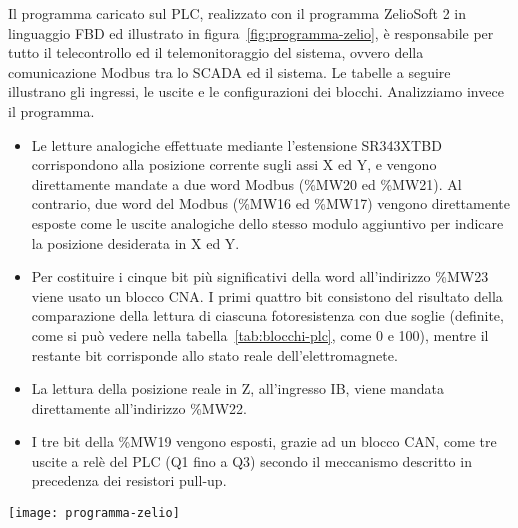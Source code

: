 Il programma caricato sul PLC, realizzato con il programma ZelioSoft 2 in linguaggio FBD ed
illustrato in figura~\ref{fig:programma-zelio}, è responsabile per tutto il telecontrollo ed il
telemonitoraggio del sistema, ovvero della comunicazione Modbus tra lo SCADA ed il sistema. Le
tabelle a seguire illustrano gli ingressi, le uscite e le configurazioni dei blocchi. Analizziamo
invece il programma.
\begin{itemize}
    \item Le letture analogiche effettuate mediante l'estensione SR343XTBD corrispondono alla
        posizione corrente sugli assi X ed Y, e vengono direttamente mandate a due word Modbus
        (\%MW20 ed \%MW21). Al contrario, due word del Modbus (\%MW16 ed \%MW17) vengono
        direttamente esposte come le uscite analogiche dello stesso modulo aggiuntivo per indicare
        la posizione desiderata in X ed Y.
    \item Per costituire i cinque bit più significativi della word all'indirizzo \%MW23 viene usato
        un blocco CNA. I primi quattro bit consistono del risultato della comparazione della lettura
        di ciascuna fotoresistenza con due soglie (definite, come si può vedere nella
        tabella~\ref{tab:blocchi-plc}, come 0 e 100), mentre il restante bit corrisponde allo stato
        reale dell'elettromagnete.
    \item La lettura della posizione reale in Z, all'ingresso IB, viene mandata direttamente
        all'indirizzo \%MW22.
    \item I tre bit della \%MW19 vengono esposti, grazie ad un blocco CAN, come tre uscite a relè
        del PLC (Q1 fino a Q3) secondo il meccanismo descritto in precedenza dei resistori pull-up.
\end{itemize}

\begin{figure*}[htbp]\centering
    \caption{Il programma caricato nel PLC.}\label{fig:programma-zelio}
    \texttt{[image: programma-zelio]}
\end{figure*}

